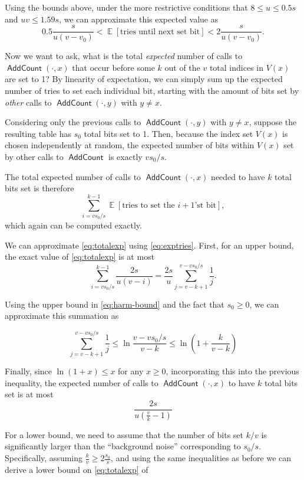 \documentclass[letterpaper,12pt]{article}
\DeclareMathOperator{\EX}{\mathbb{E}}
\DeclareMathOperator{\AddCount}{\textsf{AddCount}}
\begin{document}
Using the bounds above, under the more restrictive conditions that
$8 \le u \le 0.5s$ and $uv \le 1.59s$, we can approximate this expected
value as
\begin{equation}\label{eq:exptries}
  0.5\frac{s}{u(v-v_0)} < \EX[\text{tries until next set bit}] <
  2\frac{s}{u(v-v_0)}.
\end{equation}

Now we want to ask, what is the total \emph{expected} number of calls to
$\AddCount(\cdot,x)$ that occur before some $k$ out of the $v$ total
indices in $V(x)$ are set to 1? By linearity of expectation, we can
simply sum up the expected number of tries to set each individual bit,
starting with the amount of bits set by \emph{other} calls to
$\AddCount(\cdot,y)$ with $y\ne x$.

Considering only the previous calls to $\AddCount(\cdot,y)$ with $y\ne
x$, suppose the resulting table has $s_0$ total bits set to 1. Then,
because the index set $V(x)$ is chosen independently at random, the
expected number of bits within $V(x)$ set by other calls to $\AddCount$
is exactly $vs_0/s$.

The total expected number of calls to $\AddCount(\cdot,x)$ needed to
have $k$ total bits set is therefore
\begin{equation}\label{eq:totalexp}
  \sum_{i=vs_0/s}^{k-1} \EX[\text{tries to set the $i+1$'st bit}],
\end{equation}
which again can be computed exactly.

We can approximate \eqref{eq:totalexp} using \eqref{eq:exptries}. First,
for an upper bound, the exact value of \eqref{eq:totalexp} is at most
\[\sum_{i=vs_0/s}^{k-1} \frac{2s}{u(v-i)}
  = \frac{2s}{u}\sum_{j=v-k+1}^{v-vs_0/s} \frac{1}{j}.\]

Using the upper bound in \eqref{eq:harm-bound} and the fact that
$s_0\ge 0$, we can approximate this
summation as

\[\sum_{j=v-k+1}^{v-vs_0/s}\frac{1}{j}
  \le \ln \frac{v - vs_0/s}{v-k} \le \ln\left(1 +
  \frac{k}{v-k}\right)\]

Finally, since \(\ln(1+x) \le x\) for any $x\ge 0$, incorporating this
into the previous inequality, the expected number of calls to
$\AddCount(\cdot,x)$ to have $k$ total bits set is at most
\begin{equation}
  \frac{2s}{u\left(\tfrac{v}{k}-1\right)}
\end{equation}

For a lower bound, we need to assume that the number of bits set $k/v$
is significantly larger than the ``background noise'' corresponding to
$s_0/s$. Specifically, assuming $\frac{k}{v}\ge 2\frac{s_0}{s}$, and
using the same inequalities as before we can derive a lower bound on
\eqref{eq:totalexp} of
\end{document}
